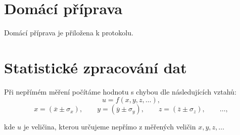 \documentclass[english]{article}
\begin{document}
\section{Domácí příprava}
	Domácí příprava je přiložena k protokolu.
\section{Statistické zpracování dat}
%	
%	
%	
Při nepřímém měření počítáme hodnotu s chybou dle následujících vztahů:
	\begin{equation}
	u = f(x, y, z, \ldots),
	\end{equation}
	\begin{displaymath}
	x = (\overline{x} \pm \sigma_x), \qquad
	y = (\overline{y} \pm \sigma_y), \qquad
	z = (\overline{z} \pm \sigma_z), \qquad
	\ldots,
	\end{displaymath}
	
	kde $ u $ je veličina, kterou určujeme nepřímo z měřených veličin $ x, y, z, \ldots $ 
	
\end{document}
